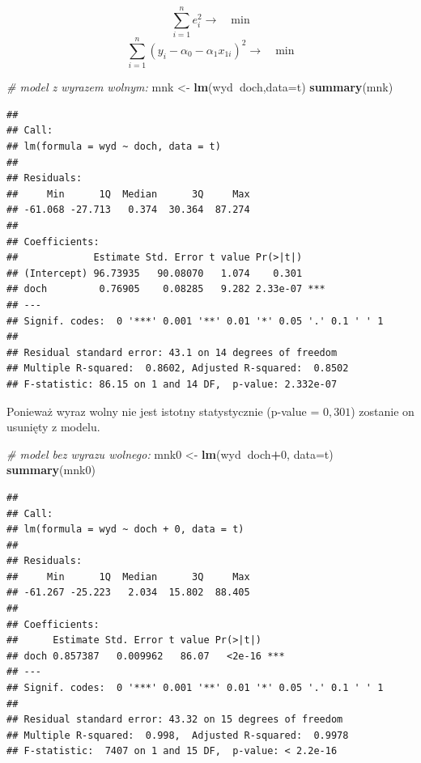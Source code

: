 \documentclass[polish,]{book}
\newenvironment{Shaded}{\begin{snugshade}}{\end{snugshade}}
\newcommand{\CommentTok}[1]{\textcolor[rgb]{0.56,0.35,0.01}{\textit{#1}}}
\newcommand{\DataTypeTok}[1]{\textcolor[rgb]{0.13,0.29,0.53}{#1}}
\newcommand{\DecValTok}[1]{\textcolor[rgb]{0.00,0.00,0.81}{#1}}
\newcommand{\KeywordTok}[1]{\textcolor[rgb]{0.13,0.29,0.53}{\textbf{#1}}}
\newcommand{\NormalTok}[1]{#1}
\newcommand{\OperatorTok}[1]{\textcolor[rgb]{0.81,0.36,0.00}{\textbf{#1}}}
\newcommand{\StringTok}[1]{\textcolor[rgb]{0.31,0.60,0.02}{#1}}
\begin{document}
\begin{equation}
\sum_{i=1}^{n}e_i^2 \longrightarrow\quad\mbox{min}
\label{eq:wz131a}
\end{equation}
\begin{equation}
\sum_{i=1}^{n}(y_i-\alpha_0-\alpha_1x_{1i})^2 \longrightarrow\quad\mbox{min}
\label{eq:wz131b}
\end{equation}

\begin{Shaded}
\begin{Highlighting}[]
\CommentTok{# model z wyrazem wolnym:}
\NormalTok{mnk <-}\StringTok{ }\KeywordTok{lm}\NormalTok{(wyd}\OperatorTok{~}\NormalTok{doch,}\DataTypeTok{data=}\NormalTok{t)}
\KeywordTok{summary}\NormalTok{(mnk)}
\end{Highlighting}
\end{Shaded}

\begin{verbatim}
## 
## Call:
## lm(formula = wyd ~ doch, data = t)
## 
## Residuals:
##     Min      1Q  Median      3Q     Max 
## -61.068 -27.713   0.374  30.364  87.274 
## 
## Coefficients:
##             Estimate Std. Error t value Pr(>|t|)    
## (Intercept) 96.73935   90.08070   1.074    0.301    
## doch         0.76905    0.08285   9.282 2.33e-07 ***
## ---
## Signif. codes:  0 '***' 0.001 '**' 0.01 '*' 0.05 '.' 0.1 ' ' 1
## 
## Residual standard error: 43.1 on 14 degrees of freedom
## Multiple R-squared:  0.8602, Adjusted R-squared:  0.8502 
## F-statistic: 86.15 on 1 and 14 DF,  p-value: 2.332e-07
\end{verbatim}

Ponieważ wyraz wolny nie jest istotny statystycznie (p-value = \(0,301\)) zostanie on usunięty z modelu.

\begin{Shaded}
\begin{Highlighting}[]
\CommentTok{# model bez wyrazu wolnego:}
\NormalTok{mnk0 <-}\StringTok{ }\KeywordTok{lm}\NormalTok{(wyd}\OperatorTok{~}\NormalTok{doch}\OperatorTok{+}\DecValTok{0}\NormalTok{, }\DataTypeTok{data=}\NormalTok{t)}
\KeywordTok{summary}\NormalTok{(mnk0)}
\end{Highlighting}
\end{Shaded}

\begin{verbatim}
## 
## Call:
## lm(formula = wyd ~ doch + 0, data = t)
## 
## Residuals:
##     Min      1Q  Median      3Q     Max 
## -61.267 -25.223   2.034  15.802  88.405 
## 
## Coefficients:
##      Estimate Std. Error t value Pr(>|t|)    
## doch 0.857387   0.009962   86.07   <2e-16 ***
## ---
## Signif. codes:  0 '***' 0.001 '**' 0.01 '*' 0.05 '.' 0.1 ' ' 1
## 
## Residual standard error: 43.32 on 15 degrees of freedom
## Multiple R-squared:  0.998,  Adjusted R-squared:  0.9978 
## F-statistic:  7407 on 1 and 15 DF,  p-value: < 2.2e-16
\end{verbatim}
\end{document}
